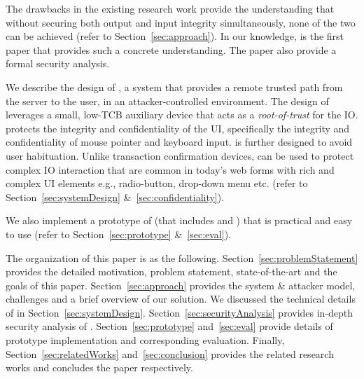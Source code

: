 \begin{mybullet}
  \item The drawbacks in the existing research work provide the understanding that without securing both output and input integrity simultaneously, none of the two can be achieved (refer to Section~\ref{sec:approach}). In our knowledge, \name is the first paper that provides such a concrete understanding. The paper also provide a formal security analysis.
  \item We describe the design of \name, a system that provides a remote trusted path from the server to the user, in an attacker-controlled environment. The design of \name leverages a small, low-TCB auxiliary device that acts as a \emph{root-of-trust} for the IO. \name protects the integrity and confidentiality of the UI, specifically the integrity and confidentiality of mouse pointer and keyboard input. \name is further designed to avoid user habituation. Unlike transaction confirmation devices, \name can be used to protect complex IO interaction that are common in today's web forms with rich and complex UI elements e.g., radio-button, drop-down menu etc. (refer to Section~\ref{sec:systemDesign} \&~\ref{sec:confidentiality}).
  \item We also implement a prototype of \name (that includes \device and \name \js) that is practical and easy to use (refer to Section~\ref{sec:prototype} \&~\ref{sec:eval}).
\end{mybullet}


 The organization of this paper is as the following. Section~\ref{sec:problemStatement} provides the detailed motivation, problem statement, state-of-the-art and the goals of this paper. Section~\ref{sec:approach} provides the system \& attacker model, challenges and a brief overview of our solution. We discussed the technical details of \name in Section~\ref{sec:systemDesign}. Section~\ref{sec:securityAnalysis} provides in-depth security analysis of \name. Section~\ref{sec:prototype} and~\ref{sec:eval} provide details of \name prototype implementation and corresponding evaluation. Finally, Section~\ref{sec:relatedWorks} and~\ref{sec:conclusion} provides the related research works and concludes the paper respectively.


